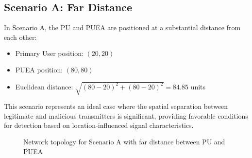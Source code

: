 \subsection{Scenario A: Far Distance}

In Scenario A, the PU and PUEA are positioned at a substantial distance from each other:
\begin{itemize}
    \item Primary User position: $(20, 20)$
    \item PUEA position: $(80, 80)$
    \item Euclidean distance: $\sqrt{(80-20)^2 + (80-20)^2} = 84.85$ units
\end{itemize}

This scenario represents an ideal case where the spatial separation between legitimate and malicious transmitters is significant, providing favorable conditions for detection based on location-influenced signal characteristics.

\begin{figure}[htbp]
    \centering
    \caption{Network topology for Scenario A with far distance between PU and PUEA}
    \label{fig:scenario_a}
\end{figure}

